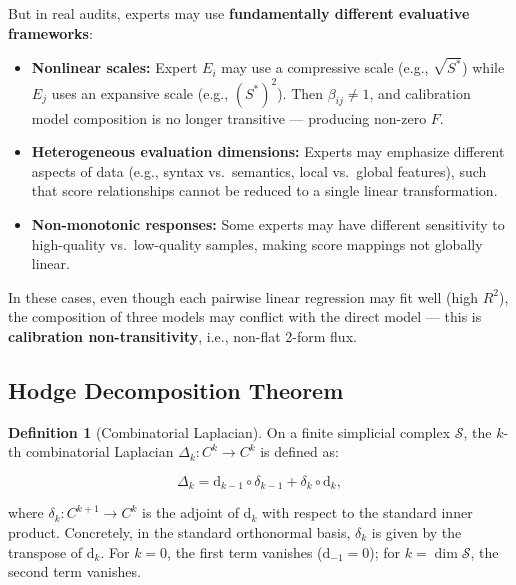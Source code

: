 \documentclass[12pt,a4paper]{article}
\theoremstyle{plain}
\theoremstyle{definition}
\newtheorem{definition}[theorem]{Definition}
\theoremstyle{remark}
\newcommand{\dd}{\mathrm{d}}
\newcommand{\SSS}{\mathcal{S}}
\begin{document}
But in real audits, experts may use \textbf{fundamentally different evaluative frameworks}:
\begin{itemize}
    \item \textbf{Nonlinear scales:} Expert $E_i$ may use a compressive scale (e.g., $\sqrt{S^*}$) while $E_j$ uses an expansive scale (e.g., $(S^*)^2$). Then $\beta_{ij} \neq 1$, and calibration model composition is no longer transitive --- producing non-zero $F$.
    \item \textbf{Heterogeneous evaluation dimensions:} Experts may emphasize different aspects of data (e.g., syntax vs.\ semantics, local vs.\ global features), such that score relationships cannot be reduced to a single linear transformation.
    \item \textbf{Non-monotonic responses:} Some experts may have different sensitivity to high-quality vs.\ low-quality samples, making score mappings not globally linear.
\end{itemize}

In these cases, even though each pairwise linear regression may fit well (high $R^2$), the composition of three models may conflict with the direct model --- this is \textbf{calibration non-transitivity}, i.e., non-flat 2-form flux.

\subsection{Hodge Decomposition Theorem}
\label{sec:hodge}

\begin{definition}[Combinatorial Laplacian]
\label{def:laplacian}
On a finite simplicial complex $\SSS$, the $k$-th combinatorial Laplacian $\Delta_k: C^k \to C^k$ is defined as:

\begin{equation}\label{eq:laplacian}
    \Delta_k = \dd_{k-1} \circ \delta_{k-1} + \delta_k \circ \dd_k,
\end{equation}

where $\delta_k: C^{k+1} \to C^k$ is the adjoint of $\dd_k$ with respect to the standard inner product. Concretely, in the standard orthonormal basis, $\delta_k$ is given by the transpose of $\dd_k$. For $k=0$, the first term vanishes ($\dd_{-1} = 0$); for $k = \dim \SSS$, the second term vanishes.
\end{definition}
\end{document}
